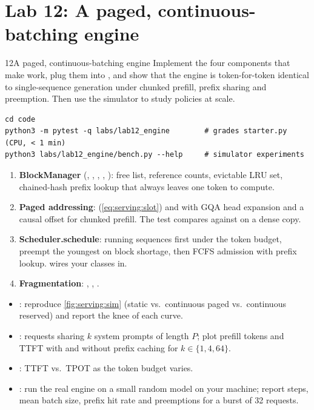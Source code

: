 \section{Lab 12: A paged, continuous-batching engine}\label{sec:serving:lab}
\begin{labbox}{12}{A paged, continuous-batching engine}
Implement the four components that make  work, plug them into ,
and show that the engine is token-for-token identical to single-sequence generation under chunked
prefill, prefix sharing and preemption. Then use the simulator to study policies at scale.

\begin{lstlisting}[style=shell]
cd code
python3 -m pytest -q labs/lab12_engine        # grades starter.py (CPU, < 1 min)
python3 labs/lab12_engine/bench.py --help     # simulator experiments
\end{lstlisting}

\begin{enumerate}
  \item \textbf{BlockManager} (, , , ,
    ): free list, reference counts, evictable LRU set, chained-hash prefix lookup that
    always leaves one token to compute.
  \item \textbf{Paged addressing}:  (\cref{eq:serving:slot}) and
     with GQA head expansion and a causal offset for chunked prefill. The test
    compares against  on a dense copy.
  \item \textbf{Scheduler.schedule}: running sequences first under the token budget, preempt the youngest
    on block shortage, then FCFS admission with prefix lookup.  wires your classes in.
  \item \textbf{Fragmentation}: , , .
\end{enumerate}

\begin{itemize}
  \item {}: reproduce \cref{fig:serving:sim} (static vs.\ continuous paged vs.\
    continuous reserved) and report the knee of each curve.
  \item {}: requests sharing $k$ system prompts of length $P$; plot prefill
    tokens and TTFT with and without prefix caching for $k\in\{1,4,64\}$.
  \item \code{bench.py --exp budget}: TTFT vs.\ TPOT as the token budget varies.
  \item \code{bench.py --exp engine}: run the real engine on a small random model on your machine; report
    steps, mean batch size, prefix hit rate and preemptions for a burst of 32 requests.
\end{itemize}


\end{labbox}
